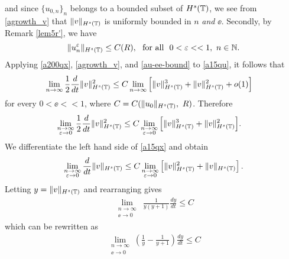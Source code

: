 and since $\{u_{0,n}\}_n$ belongs to a bounded subset of
$H^s(\mathbb{T})$, we see from \eqref{agrowth_v} that $\|v \|_{H^s(\mathbb{T})}$ is
uniformly bounded in $n$ \emph{and} $\ee$.  Secondly, by Remark \ref{lem5r'}, we have 
\begin{equation}
	\label{au-ee-bound}
	\|u^\varepsilon_n \|_{H^s(\mathbb{T})} \le C(R), \ \ \text{for all} \ \ 0 < \varepsilon <<1, \ n \in
	\mathbb{N}.
\end{equation}
Applying \eqref{a200qx}, \eqref{agrowth_v}, and \eqref{au-ee-bound}
to \eqref{a15qu}, it follows that 
\begin{equation*}
	\label{lim-est-in}
		\begin{split}
			\lim_{n \to \infty }
			\frac{1}{2}\frac{d}{dt}\|v\|_{H^{s}(\mathbb{T})}^2
			& \le
			C \lim_{n \to \infty} \Big [\|v\|_{H^s(\mathbb{T})}^3 +
			\|v\|_{H^s(\mathbb{T})}^2 + o(1)\Big ]
		\end{split}
	\end{equation*}
	for every $0 < \ee <<1$, where $C = C(\|u_0\|_{H^s(\mathbb{T})}, \ R)$.
	Therefore
	\begin{equation}
		\begin{split}
			\lim_{\substack{n \to \infty \\ \varepsilon \to 0} }
			\frac{1}{2}\frac{d}{dt}\|v\|_{H^{s}(\mathbb{T})}^2
			& \le C
			\lim_{\substack{n \to \infty \\ \varepsilon \to 0}}
			\Big [\|v\|_{H^s(\mathbb{T})}^3 + 
			\|v\|_{H^s(\mathbb{T})}^2 \Big ].
			\label{a15qx}
		\end{split}
	\end{equation}
	We differentiate the left hand side of \eqref{a15qx} and obtain
\begin{equation*}
	\begin{split}
		\lim_{\substack{n \to \infty \\ \varepsilon \to 0}}\frac{d}{dt}
		\|v\|_{H^s(\mathbb{T})} \le C
		\lim_{\substack{n \to \infty \\ \varepsilon \to 0}} \left [\|v\|_{H^s(\mathbb{T})}^2 +
		\|v\|_{H^s(\mathbb{T})} \right ].
	\end{split}
\end{equation*}
Letting $y = \|v\|_{H^s(\mathbb{T})}$ and rearranging gives
\begin{equation*}
	\begin{split}
		\lim_{\substack{n \to \infty \\ \ee \to 0} } \ \frac{1}{y(y+1)} \frac{dy}{dt}
		\le	C
	\end{split}
\end{equation*}
which can be rewritten as
\begin{equation*}
	\begin{split}
		\lim_{\substack{n \to \infty \\ \ee \to 0} }
		\left( \frac{1}{y} - \frac{1}{y+1} \right)\frac{dy}{dt} \le C 
	\end{split}
\end{equation*}
